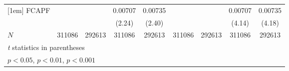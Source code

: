 {\begin{tabular}{l*{8}{c}}
[1em]
FCAPF       &                     &                     &     0.00707\sym{*}  &     0.00735\sym{*}  &                     &                     &     0.00707\sym{***}&     0.00735\sym{***}\\
            &                     &                     &      (2.24)         &      (2.40)         &                     &                     &      (4.14)         &      (4.18)         \\
\hline
\(N\)       &      311086         &      292613         &      311086         &      292613         &      311086         &      292613         &      311086         &      292613         \\
\hline\hline
\multicolumn{9}{l}{\footnotesize \textit{t} statistics in parentheses}\\
\multicolumn{9}{l}{\footnotesize \sym{*} \(p<0.05\), \sym{**} \(p<0.01\), \sym{***} \(p<0.001\)}\\
\end{tabular}
}
